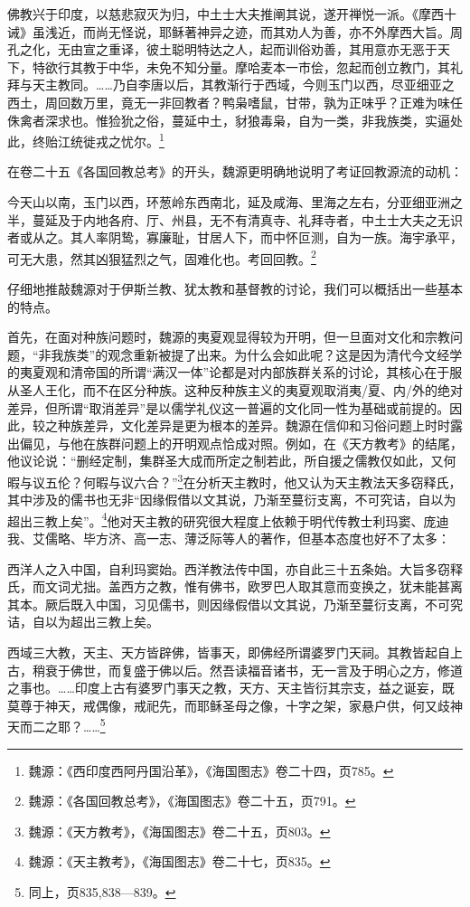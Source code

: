 \documentclass[a4paper, 12pt, openright]{ctexbook}
\renewenvironment{quote}
  {\list{}{\rightmargin2\ccwd \leftmargin2\ccwd \itemindent=2\ccwd \listparindent=2\ccwd}%
   \item\relax\small\kaishu\color{black}}
  {\endlist}
\begin{document}
\begin{quote}
佛教兴于印度，以慈悲寂灭为归，中土士大夫推阐其说，遂开禅悦一派。《摩西十诫》虽浅近，而尚无怪说，耶稣著神异之迹，而其劝人为善，亦不外摩西大旨。周孔之化，无由宣之重译，彼土聪明特达之人，起而训俗劝善，其用意亦无恶于天下，特欲行其教于中华，未免不知分量。摩哈麦本一市侩，忽起而创立教门，其礼拜与天主教同。……乃自李唐以后，其教渐行于西域，今则玉门以西，尽亚细亚之西土，周回数万里，竟无一非回教者？鸭枭嗜鼠，甘带，孰为正味乎？正难为味任侏禽者深求也。惟猃狁之俗，蔓延中土，豺狼毒枭，自为一类，非我族类，实逼处此，终贻江统徙戎之忧尔。\footnote{魏源：《西印度西阿丹国沿革》，《海国图志》卷二十四，页785。}
\end{quote}

在卷二十五《各国回教总考》的开头，魏源更明确地说明了考证回教源流的动机：

\begin{quote}
今天山以南，玉门以西，环葱岭东西南北，延及咸海、里海之左右，分亚细亚洲之半，蔓延及于内地各府、厅、州县，无不有清真寺、礼拜寺者，中土士大夫之无识者或从之。其人率阴鸷，寡廉耻，甘居人下，而中怀叵测，自为一族。海宇承平，可无大患，然其凶狠猛烈之气，固难化也。考回回教。\footnote{魏源：《各国回教总考》，《海国图志》卷二十五，页791。}
\end{quote}

仔细地推敲魏源对于伊斯兰教、犹太教和基督教的讨论，我们可以概括出一些基本的特点。

首先，在面对种族问题时，魏源的夷夏观显得较为开明，但一旦面对文化和宗教问题，“非我族类”的观念重新被提了出来。为什么会如此呢？这是因为清代今文经学的夷夏观和清帝国的所谓“满汉一体”论都是对内部族群关系的讨论，其核心在于服从圣人王化，而不在区分种族。这种反种族主义的夷夏观取消夷/夏、内/外的绝对差异，但所谓“取消差异”是以儒学礼仪这一普遍的文化同一性为基础或前提的。因此，较之种族差异，文化差异是更为根本的差异。魏源在信仰和习俗问题上时时露出偏见，与他在族群问题上的开明观点恰成对照。例如，在《天方教考》的结尾，他议论说：“删经定制，集群圣大成而所定之制若此，所自援之儒教仅如此，又何暇与议五伦？何暇与议六合？”\footnote{魏源：《天方教考》，《海国图志》卷二十五，页803。}在分析天主教时，他又认为天主教法天多窃释氏，其中涉及的儒书也无非“因缘假借以文其说，乃渐至蔓衍支离，不可究诘，自以为超出三教上矣”。\footnote{魏源：《天主教考》，《海国图志》卷二十七，页835。}他对天主教的研究很大程度上依赖于明代传教士利玛窦、庞迪我、艾儒略、毕方济、高一志、薄泛际等人的著作，但基本态度也好不了太多：

\begin{quote}
西洋人之入中国，自利玛窦始。西洋教法传中国，亦自此三十五条始。大旨多窃释氏，而文词尤拙。盖西方之教，惟有佛书，欧罗巴人取其意而变换之，犹未能甚离其本。厥后既入中国，习见儒书，则因缘假借以文其说，乃渐至蔓衍支离，不可究诘，自以为超出三教上矣。

西域三大教，天主、天方皆辟佛，皆事天，即佛经所谓婆罗门天祠。其教皆起自上古，稍衰于佛世，而复盛于佛以后。然吾读福音诸书，无一言及于明心之方，修道之事也。……印度上古有婆罗门事天之教，天方、天主皆衍其宗支，益之诞妄，既莫尊于神天，戒偶像，戒祀先，而耶稣圣母之像，十字之架，家悬户供，何又歧神天而二之耶？……\footnote{同上，页835,838—839。}
\end{quote}
\end{document}
